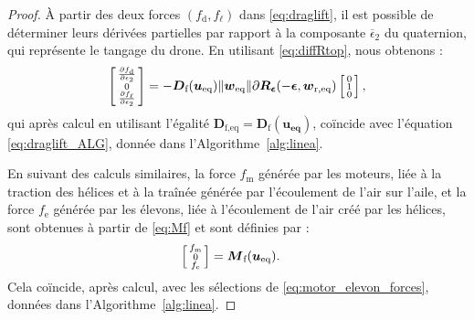 \begin{proof}
À partir des deux forces $(f_{\text{d}} , f_{\ell})$ dans \eqref{eq:draglift}, il est possible de déterminer leurs dérivées partielles par rapport à la composante $\overline \epsilon_2$ du quaternion, qui représente le tangage du drone. En utilisant \eqref{eq:diffRtop}, nous obtenons :
\begin{align}
    \left[ \begin{smallmatrix}\frac{\partial  f_{\text{d}}  }{\partial \epsilon_{2}} \\ 0 \\ \frac{\partial  f_{\ell}  }{\partial \epsilon_{2}} \end{smallmatrix} \right] = - \boldsymbol{D}_{\text{f}}(\boldsymbol{u_{\text{eq}}})  \lVert \boldsymbol{w}_{\mathrm{eq}} \rVert \partial \boldsymbol{R}_{\boldsymbol{ \epsilon}}( -\boldsymbol{ \epsilon}, \boldsymbol{w}_{\mathrm{r,eq}}) \left[ \begin{smallmatrix}0\\ 1\\ 0 \end{smallmatrix} \right],
\end{align}
qui après calcul en utilisant l'égalité $\boldsymbol{D}_{\text{f,eq}} = \boldsymbol{D}_{\text{f}}(\boldsymbol{u_{\text{eq}}})$,
coïncide avec l'équation \eqref{eq:draglift_ALG}, donnée dans l'Algorithme~\ref{alg:linea}.

En suivant des calculs similaires, la force $f_{\text{m}}$ générée par les moteurs, liée à la traction des hélices et à la traînée générée par l'écoulement de l'air sur l'aile, et la force $f_{\text{e}}$ générée par les élevons, liée à l'écoulement de l'air créé par les hélices, sont obtenues à partir de \eqref{eq:Mf} et sont définies par :
\begin{align}
\label{eq:motor_el}
    \left[ \begin{smallmatrix} f_{\text{m}}  \\ 0 \\ f_{\text{e}}  \end{smallmatrix} \right] &= \boldsymbol{M}_{\text{f}}(\boldsymbol{u_{\text{eq}}}).
\end{align}
Cela coïncide, après calcul, avec les sélections de \eqref{eq:motor_elevon_forces}, données dans l'Algorithme~\ref{alg:linea}.


\end{proof}
